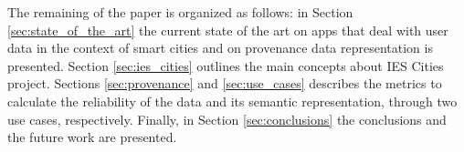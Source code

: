 The remaining of the paper is organized as follows: in Section \ref{sec:state_of_the_art} the current state of the art on apps that deal with user data in the context of smart cities and on provenance data representation is presented. Section \ref{sec:ies_cities} outlines the main concepts about IES Cities project. Sections \ref{sec:provenance} and \ref{sec:use_cases} describes the metrics to calculate the reliability of the data and its semantic representation, through two use cases, respectively. Finally, in Section \ref{sec:conclusions} the conclusions and the future work are presented.
